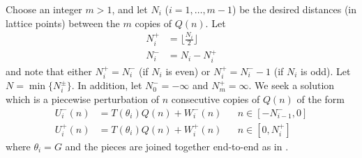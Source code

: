 \documentclass[12pt]{article}
\begin{document}
Choose an integer $m > 1$, and let $N_i$ ($i = 1, \dots, m-1$) be the desired distances (in lattice points) between the $m$ copies of $Q(n)$. Let 
\begin{equation}\label{Nipm}
\begin{aligned}
N_i^+ &= \lfloor \frac{N_i}{2} \rfloor \\
N_i^- &= N_i - N_i^+
\end{aligned}
\end{equation}
and note that either $N_i^+ = N_i^-$ (if $N_i$ is even) or $N_i^+ = N_i^- - 1$ (if $N_i$ is odd). Let $N = \min\{ N_i^\pm \}$. In addition, let $N_0^- = -\infty$ and $N_m^+ = \infty$. We seek a solution which is a piecewise perturbation of $n$ consecutive copies of $Q(n)$ of the form
\begin{align}\label{Upiecewise}
U_i^-(n) &= T(\theta_i) Q(n) + W_i^-(n) && n \in [-N_{i-1}^-, 0] \\
U_i^+(n) &= T(\theta_i) Q(n) + W_i^+(n) && n \in [0, N_i^+]
\end{align}
where $\theta_i = G$ and the pieces are joined together end-to-end as in \cite{Sandstede1998}. 
\end{document}

